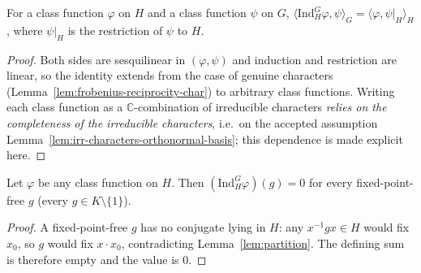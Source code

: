 \begin{lemma}
    \label{lem:frobenius-reciprocity}
    For a class function $\varphi$ on $H$ and a class function $\psi$ on $G$,
    $\langle \mathrm{Ind}_H^G \varphi, \psi \rangle_G =
    \langle \varphi, \psi|_H \rangle_H$,
    where $\psi|_H$ is the restriction of $\psi$ to $H$.
\end{lemma}
\begin{proof}
    Both sides are sesquilinear in $(\varphi, \psi)$ and induction and
    restriction are linear, so the identity extends from the case of genuine
    characters (Lemma~\ref{lem:frobenius-reciprocity-char}) to arbitrary class
    functions. Writing each class function as a $\mathbb{C}$-combination of
    irreducible characters \emph{relies on the completeness of the irreducible
    characters}, i.e.\ on the accepted assumption
    Lemma~\ref{lem:irr-characters-orthonormal-basis}; this dependence is made
    explicit here.
\end{proof}

\begin{lemma}
    \label{lem:induced-vanishing-on-kernel}
    \leanok
    Let $\varphi$ be any class function on $H$. Then $(\mathrm{Ind}_H^G
    \varphi)(g) = 0$ for every fixed-point-free $g$ (every $g \in K \setminus
    \{1\}$).
\end{lemma}
\begin{proof}
    A fixed-point-free $g$ has no conjugate lying in $H$: any $x^{-1} g x \in H$
    would fix $x_0$, so $g$ would fix $x \cdot x_0$, contradicting
    Lemma~\ref{lem:partition}. The defining sum is therefore empty and the value
    is $0$.
\end{proof}

